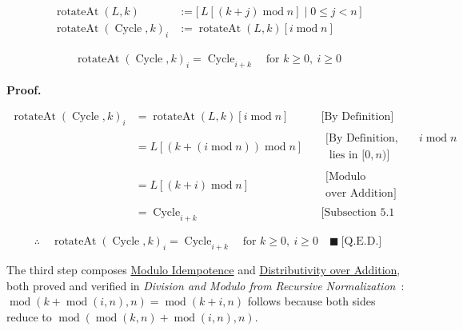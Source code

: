 \begin{equation*}
\begin{aligned}
\operatorname{rotateAt}(L,k)
  &:=\big[\,L[(k+j)\operatorname{mod}n]\mid 0\leq j<n\,\big] \\
\operatorname{rotateAt}(\operatorname{Cycle},k)_i
  &:=\operatorname{rotateAt}(L,k)[i\operatorname{mod}n]
\end{aligned}
\end{equation*}

\begin{equation*}
\begin{aligned}
\operatorname{rotateAt}(\operatorname{Cycle},k)_i
  =\operatorname{Cycle}_{i+k}\quad\text{for }k\geq 0,\ i\geq 0
\end{aligned}
\end{equation*}

\noindent\textbf{Proof.}

\begin{equation*}
\begin{aligned}
\operatorname{rotateAt}(\operatorname{Cycle},k)_i
  &=\operatorname{rotateAt}(L,k)[i\operatorname{mod}n]
  && \text{[By Definition]} \\
  &=L[(k+(i\operatorname{mod}n))\operatorname{mod}n]
  && \substack{\text{[By Definition, since }i\operatorname{mod}n\\
                \text{ lies in }[0,n)\text{]}} \\
  &=L[(k+i)\operatorname{mod}n]
  && \substack{\text{[Modulo Idempotence + Distributivity}\\
                \text{over Addition]}} \\
  &=\operatorname{Cycle}_{i+k}
  && \text{[Subsection 5.1 Cycle Element Access]}
\end{aligned}
\end{equation*}

\begin{equation*}
\therefore\quad
\operatorname{rotateAt}(\operatorname{Cycle},k)_i
  =\operatorname{Cycle}_{i+k}\quad\text{for }k\geq 0,\ i\geq 0
  \quad \blacksquare\ \text{[Q.E.D.]}
\end{equation*}

The third step composes
\href{https://github.com/thiagomata/prime-numbers/blob/cycle-article-v1.0.0/articles/chapter2/modulo.md#68-modulo-idempotence}{Modulo Idempotence}
and
\href{https://github.com/thiagomata/prime-numbers/blob/cycle-article-v1.0.0/articles/chapter2/modulo.md#69-distributivity-over-addition}{Distributivity over Addition},
both proved and verified in
\emph{Division and Modulo from Recursive Normalization}~\cite{mata2026modulo}:
$\operatorname{mod}(k+\operatorname{mod}(i,n),n)
=\operatorname{mod}(k+i,n)$ follows because both sides reduce to
$\operatorname{mod}(\operatorname{mod}(k,n)+
\operatorname{mod}(i,n),n)$.

